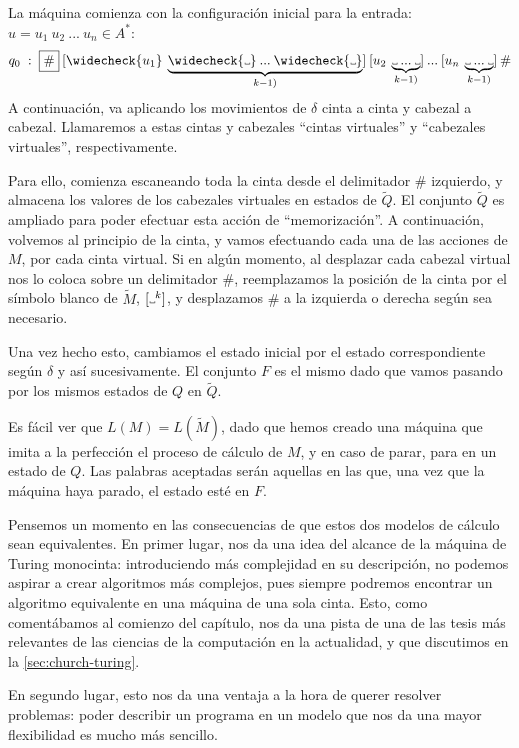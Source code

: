 \begin{proofw}
La máquina comienza con la configuración inicial para la entrada: $u=u_1\:u_2\:...\:u_n\in A^*$:
$$
    q_0\;:\;\fbox{\#}\:[\widecheck{u_1}\:\underbrace{\widecheck{\Vtextvisiblespace} \:... \:\widecheck{\Vtextvisiblespace}}_{k-1)}]\:[u_2\:\underbrace{{\Vtextvisiblespace} \:... \:{\Vtextvisiblespace}}_{k-1)}]\:...\:[u_n\:\underbrace{{\Vtextvisiblespace} \:... \:{\Vtextvisiblespace}}_{k-1)}]\:\#
$$
A continuación, va aplicando los movimientos de $\delta$ cinta a cinta y cabezal a cabezal. Llamaremos a estas cintas y cabezales ``cintas virtuales'' y ``cabezales virtuales'', respectivamente.

Para ello, comienza escaneando toda la cinta desde el delimitador $\#$ izquierdo, y almacena los valores de los cabezales virtuales en estados de $\widetilde{Q}$. El conjunto $\widetilde{Q}$ es ampliado para poder efectuar esta acción de ``memorización''. A continuación, volvemos al principio de la cinta, y vamos efectuando cada una de las acciones de $M$, por cada cinta virtual. Si en algún momento, al desplazar cada cabezal virtual nos lo coloca sobre un delimitador $\#$, reemplazamos la posición de la cinta por el símbolo blanco de $\widetilde{M}$, $[\Vtextvisiblespace^k]$, y desplazamos $\#$ a la izquierda o derecha según sea necesario.

Una vez hecho esto, cambiamos el estado inicial por el estado correspondiente según $\delta$ y así sucesivamente. El conjunto $F$ es el mismo dado que vamos pasando por los mismos estados de $Q$ en $\widetilde{Q}$.

Es fácil ver que $L(M)=L(\widetilde{M})$, dado que hemos creado una máquina que imita a la perfección el proceso de cálculo de $M$, y en caso de parar, para en un estado de $Q$. Las palabras aceptadas serán aquellas en las que, una vez que la máquina haya parado, el estado esté en $F$.
\end{proofw}

Pensemos un momento en las consecuencias de que estos dos modelos de cálculo sean equivalentes. En primer lugar, nos da una idea del alcance de la máquina de Turing monocinta: introduciendo más complejidad en su descripción, no podemos aspirar a crear algoritmos más complejos, pues siempre podremos encontrar un algoritmo equivalente en una máquina de una sola cinta. Esto, como comentábamos al comienzo del capítulo, nos da una pista de una de las tesis más relevantes de las ciencias de la computación en la actualidad, y que discutimos en la \cref{sec:church-turing}.

En segundo lugar, esto nos da una ventaja a la hora de querer resolver problemas: poder describir un programa en un modelo que nos da una mayor flexibilidad es mucho más sencillo.

